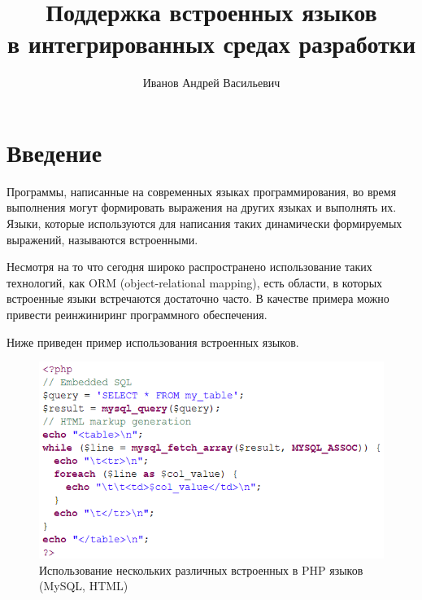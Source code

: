 \title{Поддержка встроенных языков \\ в интегрированных средах разработки}
%

\author{Иванов Андрей Васильевич}
%
%
%

\maketitle              %
\section*{Введение}

Программы, написанные на современных языках программирования, во время выполнения могут формировать 
выражения на других языках и выполнять их. Языки, которые используются для написания таких динамически 
формируемых выражений, называются встроенными. 

Несмотря на то что сегодня широко распространено использование таких технологий, как ORM (object-relational mapping), 
есть области, в которых встроенные языки встречаются достаточно часто. В качестве примера можно привести реинжиниринг 
программного обеспечения. 

Ниже приведен пример использования встроенных языков.

\begin{figure}[h]
\label{PHP}
\centering
\includegraphics[width=\linewidth]{Ivanov/Pictures/PHP.png}
\caption{Использование нескольких различных встроенных в PHP языков (MySQL, HTML)}
\end{figure}

